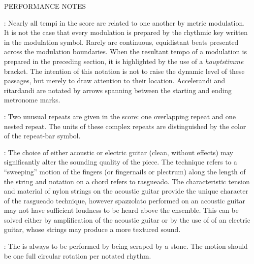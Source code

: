 \documentclass[11pt]{article}
\begin{document}

\begin{center}
\huge PERFORMANCE NOTES
\end{center}
\begingroup
\begin{center}

 : Nearly all tempi in the score are related to one another by metric modulation. It is not the case that every modulation is prepared by the rhythmic key written in the modulation symbol. Rarely are continuous, equidistant beats presented across the modulation boundaries. When the resultant tempo of a modulation is prepared in the preceding section, it is highlighted by the use of a \textit{hauptstimme} bracket. The intention of this notation is not to raise the dynamic level of these passages, but merely to draw attention to their location. Accelerandi and ritardandi are notated by arrows spanning between the starting and ending metronome marks.
\rightskip\leftskip
\phantom{text} \hfill \phantom{()}

 : Two unusual repeats are given in the score: one overlapping repeat and one nested repeat. The units of these complex repeats are distinguished by the color of the repeat-bar symbol.
\rightskip\leftskip
\phantom{text} \hfill \phantom{()}

 : The choice of either acoustic or electric guitar (clean, without effects) may significantly alter the sounding quality of the piece. The  technique refers to a ``sweeping'' motion of the fingers (or fingernails or plectrum) along the length of the string and  notation on a chord refers to rasgueado. The characteristic tension and material of nylon strings on the acoustic guitar provide the unique character of the rasgueado technique, however spazzolato performed on an acoustic guitar may not have sufficient loudness to be heard above the ensemble. This can be solved either by amplification of the acoustic guitar or by the use of of an electric guitar, whose strings may produce a more textured sound. 
\rightskip\leftskip
\phantom{text} \hfill \phantom{()}

 : The  is always to be performed by being scraped by a stone. The motion should be one full circular rotation per notated rhythm.
\rightskip\leftskip
\phantom{text} \hfill \phantom{()}


\end{center}
\end{document}
